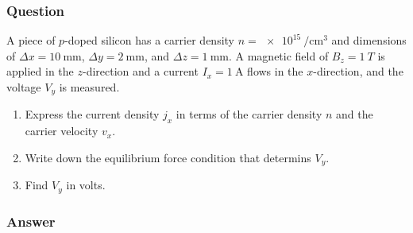 \subsubsection{Question}

A piece of $p$-doped silicon has a carrier density
$n=\SI[per-mode=reciprocal]{e15}{\per\cm\cubed}$ and dimensions of $Δx =
\SI{10}{\mm}$, $Δy = \SI{2}{\mm}$, and $Δz = \SI{1}{\mm}$. A magnetic field
of $B_z = \SI{1}{T}$ is applied in the $z$-direction and a current $I_x =
\SI{1}{\A}$ flows in the $x$-direction, and the voltage $V_y$ is measured.
\begin{enumerate}
	\item
		Express the current density $j_x$ in terms of the carrier density $n$
		and the carrier velocity $v_x$.
	\item
		Write down the equilibrium force condition that determins $V_y$.
	\item
		Find $V_y$ in volts.
\end{enumerate}

\subsubsection{Answer}

